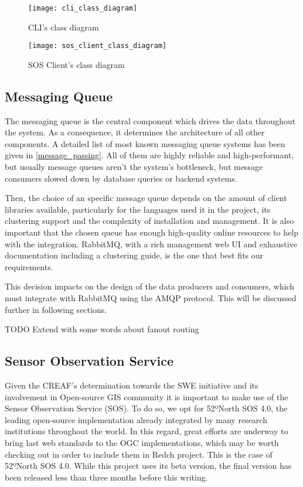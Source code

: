 \begin{sidewaysfigure}
	\texttt{[image: cli\_class\_diagram]}
	\caption{CLI's class diagram}
	\label{fig:cli_class_diagram}
\end{sidewaysfigure}

\begin{sidewaysfigure}
	\texttt{[image: sos\_client\_class\_diagram]}
	\caption{SOS Client's class diagram}
	\label{fig:sos_client_class_diagram}
\end{sidewaysfigure}

\subsection{Messaging Queue}

The messaging queue is the central component which drives the data throughout the system. As a consequence, it determines the architecture of all other components. A detailed list of most known messaging queue systems has been given in \ref{message_passing}. All of them are highly reliable and high-performant, but usually message queues aren't the system's bottleneck, but message consumers slowed down by database queries or backend systems.

Then, the choice of an specific message queue depends on the amount of client libraries available, particularly for the languages used it in the project, its clustering support and the complexity of installation and management. It is also important that the chosen queue has enough high-quality online resources to help with the integration. RabbitMQ, with a rich management web UI and exhaustive documentation including a clustering guide, is the one that best fits our requirements.

This decision impacts on the design of the data producers and consumers, which must integrate with RabbitMQ using the AMQP protocol. This will be discussed further in following sections.

TODO Extend with some words about fanout routing

\subsection{Sensor Observation Service}

Given the CREAF's determination towards the SWE initiative and its involvement in Open-source GIS community it is important to make use of the Sensor Observation Service (SOS). To do so, we opt for 52ºNorth SOS 4.0, the leading open-source implementation already integrated by many research institutions throughout the world. In this regard, great efforts are underway to bring last web standards to the OGC implementations, which may be worth checking out in order to include them in Redch project. This is the case of 52ºNorth SOS 4.0. While this project uses its beta version, the final version has been released less than three months before this writing.

